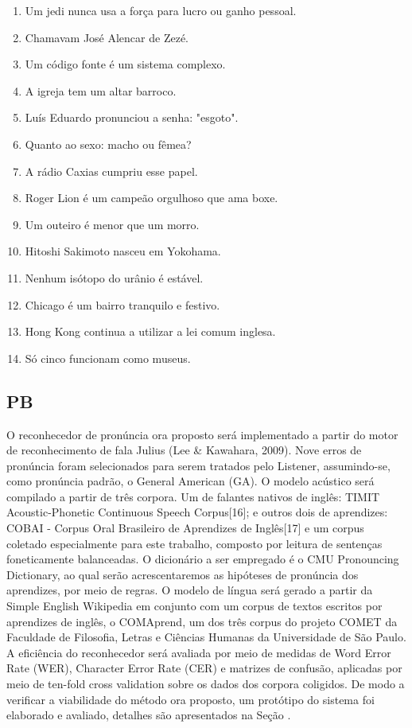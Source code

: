 \begin{enumerate}
\item Um jedi nunca usa a for\c{c}a para lucro ou ganho pessoal.
\item Chamavam Jos\'e Alencar de Zez\'e.
\item Um c\'odigo fonte \'e um sistema complexo.
\item A igreja tem um altar barroco.
\item Lu\'is Eduardo pronunciou a senha: "esgoto".
\item Quanto ao sexo: macho ou f\^emea?
\item A r\'adio Caxias cumpriu esse papel.
\item Roger Lion \'e um campe\~ao orgulhoso que ama boxe.
\item Um outeiro \'e menor que um morro.
\item Hitoshi Sakimoto nasceu em Yokohama.
\item Nenhum is\'otopo do ur\^anio \'e est\'avel.
\item Chicago \'e um bairro tranquilo e festivo.
\item Hong Kong continua a utilizar a lei comum inglesa.
\item S\'o cinco funcionam como museus.
\end{enumerate}


\subsection{PB}

O reconhecedor de pron\'uncia ora proposto ser\'a implementado a partir do
motor de reconhecimento de fala Julius (Lee \& Kawahara, 2009). Nove
erros de pron\'uncia foram selecionados para serem tratados pelo Listener,
assumindo-se, como pron\'uncia padr\~ao, o General American (GA). O modelo
ac\'ustico ser\'a compilado a partir de tr\^es corpora. Um de falantes nativos
de ingl\^es: TIMIT Acoustic-Phonetic Continuous Speech Corpus{[}16{]}; e
outros dois de aprendizes: COBAI - Corpus Oral Brasileiro de Aprendizes
de Ingl\^es{[}17{]} e um corpus coletado especialmente para este trabalho,
composto por leitura de senten\c{c}as foneticamente balanceadas. O
dicion\'ario a ser empregado \'e o CMU Pronouncing Dictionary, ao qual ser\~ao
acrescentaremos as hip\'oteses de pron\'uncia dos aprendizes, por meio de
regras. O modelo de l\'ingua ser\'a gerado a partir da Simple English
Wikipedia em conjunto com um corpus de textos escritos por aprendizes de
ingl\^es, o COMAprend, um dos tr\^es corpus do projeto COMET da Faculdade de
Filosofia, Letras e Ci\^encias Humanas da Universidade de S\~ao Paulo. A
efici\^encia do reconhecedor ser\'a avaliada por meio de medidas de Word
Error Rate (WER), Character Error Rate (CER) e matrizes de confus\~ao,
aplicadas por meio de ten-fold cross validation sobre os dados dos
corpora coligidos. De modo a verificar a viabilidade do m\'etodo ora
proposto, um prot\'otipo do sistema foi elaborado e avaliado, detalhes s\~ao
apresentados na Se\c{c}\~ao .

